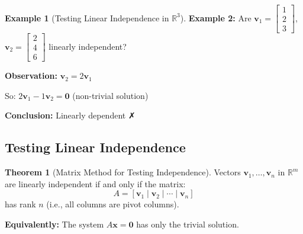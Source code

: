 \documentclass[12pt,a4paper]{article}
\theoremstyle{definition}
\newtheorem{theorem}{Theorem}[section]
\newtheorem{example}{Example}[section]
\begin{document}
\begin{example}[Testing Linear Independence in $\mathbb{R}^3$]
\textbf{Example 2:} Are $\mathbf{v}_1 = \begin{bmatrix} 1 \\ 2 \\ 3 \end{bmatrix}$, $\mathbf{v}_2 = \begin{bmatrix} 2 \\ 4 \\ 6 \end{bmatrix}$ linearly independent?

\textbf{Observation:} $\mathbf{v}_2 = 2\mathbf{v}_1$

So: $2\mathbf{v}_1 - 1\mathbf{v}_2 = \mathbf{0}$ (non-trivial solution)

\textbf{Conclusion:} Linearly dependent ✗
\end{example}

\subsection{Testing Linear Independence}

\begin{theorem}[Matrix Method for Testing Independence]
Vectors $\mathbf{v}_1, \ldots, \mathbf{v}_n$ in $\mathbb{R}^m$ are linearly independent if and only if the matrix:
\begin{equation}
A = [\mathbf{v}_1 \mid \mathbf{v}_2 \mid \cdots \mid \mathbf{v}_n]
\end{equation}
has rank $n$ (i.e., all columns are pivot columns).

\textbf{Equivalently:} The system $A\mathbf{x} = \mathbf{0}$ has only the trivial solution.
\end{theorem}
\end{document}
